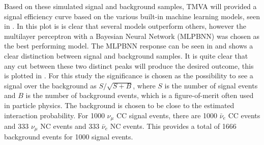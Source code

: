 Based on these simulated signal and background samples, TMVA will provided a signal efficiency curve based on the various built-in machine learning models, seen in . In this plot is is clear that several models outperform others, however the multilayer perceptron with a Bayesian Neural Network (MLPBNN) was chosen as the best performing model. The MLPBNN response can be seen in  and shows a clear distinction between signal and background samples. It is quite clear that any cut between these two distinct peaks will produce the desired outcome, this is plotted in . For this study the significance is chosen as the possibility to see a signal over the background as $S/\sqrt{S+B}$, where $S$ is the number of signal events and $B$ is the number of background events, which is a figure-of-merit often used in particle physics. The background is chosen to be close to the estimated interaction probability. For 1000 $\nu_\mu$ CC signal events, there are 1000 $\bar{\nu}_e$ CC events and 333 $\nu_\mu$ NC events and 333 $\bar{\nu}_e$ NC events. This provides a total of 1666 background events for 1000 signal events.







